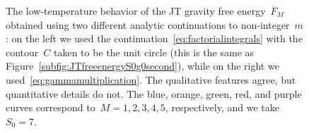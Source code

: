 \documentclass[12pt]{article}
\begin{document}
\begin{figure}[t]
\centering
{}%
\caption{The low-temperature behavior of the JT gravity free energy~$\overline{F}_M$ obtained using two different analytic continuations to non-integer~$m$: on the left we used the continuation~\eqref{eq:factorialintegrals} with the contour~$C$ taken to be the unit circle (this is the same as Figure~\ref{subfig:JTfreeenergyS0g0second}), while on the right we used~\eqref{eq:gammamultiplication}.  The qualitative features agree, but quantitative details do not.  The blue, orange, green, red, and purple curves correspond to~$M = 1,2,3,4,5$, respectively, and we take~$S_0 = 7$.}
\label{fig:othercontinuation}
\end{figure}
\end{document}
